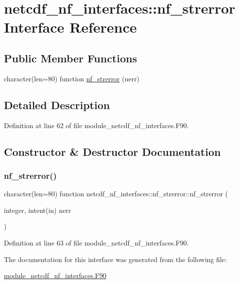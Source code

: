 \hypertarget{interfacenetcdf__nf__interfaces_1_1nf__strerror}{}\section{netcdf\+\_\+nf\+\_\+interfaces\+:\+:nf\+\_\+strerror Interface Reference}
\label{interfacenetcdf__nf__interfaces_1_1nf__strerror}
\subsection*{Public Member Functions}
\begin{DoxyCompactItemize}
\item 
character(len=80) function \hyperlink{interfacenetcdf__nf__interfaces_1_1nf__strerror_a0cf07a7eb886945639c834651c635b6d}{nf\+\_\+strerror} (nerr)
\end{DoxyCompactItemize}


\subsection{Detailed Description}


Definition at line 62 of file module\+\_\+netcdf\+\_\+nf\+\_\+interfaces.\+F90.



\subsection{Constructor \& Destructor Documentation}
\mbox{\label{interfacenetcdf__nf__interfaces_1_1nf__strerror_a0cf07a7eb886945639c834651c635b6d}} 
\subsubsection{\texorpdfstring{nf\+\_\+strerror()}{nf\_strerror()}}
{\footnotesize\ttfamily character(len=80) function netcdf\+\_\+nf\+\_\+interfaces\+::nf\+\_\+strerror\+::nf\+\_\+strerror (\begin{DoxyParamCaption}\item[{integer, intent(in)}]{nerr }\end{DoxyParamCaption})}



Definition at line 63 of file module\+\_\+netcdf\+\_\+nf\+\_\+interfaces.\+F90.



The documentation for this interface was generated from the following file\+:\begin{DoxyCompactItemize}
\item 
\hyperlink{module__netcdf__nf__interfaces_8F90}{module\+\_\+netcdf\+\_\+nf\+\_\+interfaces.\+F90}\end{DoxyCompactItemize}
